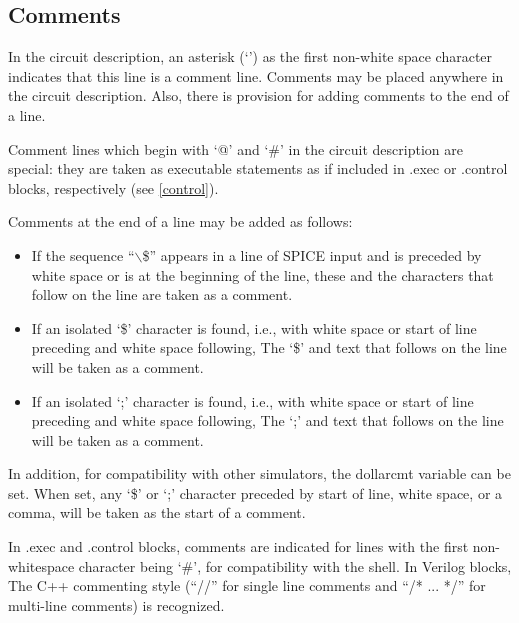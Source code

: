 \subsection{Comments}


In the circuit description, an asterisk (`{\vt *}') as the first
non-white space character indicates that this line is a comment line. 
Comments may be placed anywhere in the circuit description.  Also,
there is provision for adding comments to the end of a line.

Comment lines which begin with `{\vt *@}' and `{\vt *\#}' in the
circuit description are special:  they are taken as executable
statements as if included in {\vt .exec} or {\vt .control} blocks,
respectively (see \ref{control}).

Comments at the end of a line may be added as follows:
\begin{itemize}
\item{If the sequence ``{\vt $\backslash$\$}'' appears in a line of
  SPICE input and is preceded by white space or is at the beginning
  of the line, these and the characters that follow on the line are
  taken as a comment.}
\item{If an isolated `{\vt \$}' character is found, i.e., with
  white space or start of line preceding and white space
  following, The `{\vt \$}' and text that follows on the line
  will be taken as a comment.}
\item{If an isolated `{\vt ;}' character is found, i.e., with
  white space or start of line preceding and white space
  following, The `{\vt ;}' and text that follows on the line
  will be taken as a comment.}
\end{itemize}

In addition, for compatibility with other simulators, the {\et
dollarcmt} variable can be set.  When set, any `{\vt \$}' or `{\vt ;}'
character preceded by start of line, white space, or a comma, will be
taken as the start of a comment.

In {\vt .exec} and {\vt .control} blocks, comments are indicated for
lines with the first non-whitespace character being `{\vt \#}', for
compatibility with the shell.  In Verilog blocks, The C++ commenting
style (``{\vt //}'' for single line comments and ``{\vt /* ...  */}''
for multi-line comments) is recognized.

